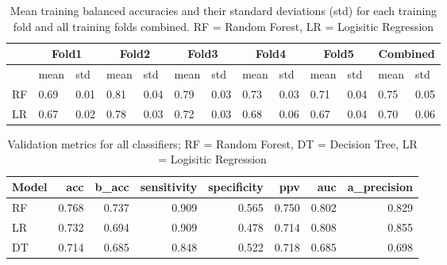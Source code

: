 \begin{table}
\centering
\begin{tabular}{lllllllllllll}
 &
  \multicolumn{2}{c}{Fold1} &
  \multicolumn{2}{c}{Fold2} &
  \multicolumn{2}{c}{Fold3} &
  \multicolumn{2}{c}{Fold4} &
  \multicolumn{2}{c}{Fold5} &
  \multicolumn{2}{c}{Combined} \\ \hline
   & mean & std  & mean & std  & mean & std  & mean & std  & mean & std  & mean 
& std  \\ \hline
RF & 0.69 & 0.01 & 0.81 & 0.04 & 0.79 & 0.03 & 0.73 & 0.03 & 0.71 & 0.04 & 0.75 
& 0.05 \\
LR & 0.67 & 0.02 & 0.78 & 0.03 & 0.72 & 0.03 & 0.68 & 0.06 & 0.67 & 0.04 & 0.70 
& 0.06
\end{tabular}
\caption{Mean training balanced accuracies and their standard deviations (std) 
for each training fold and all training folds combined. RF = Random Forest, 
LR = Logisitic Regression }
\label{tab:training-b_acc}
\end{table}
\begin{table}
\centering
\begin{tabular}{lrrrrrrr}
Model &   acc &  b\_acc &  sensitivity &  specificity &   ppv &   auc &  
a\_precision \\ \hline
   RF & 0.768 &  0.737 &        0.909 &        0.565 & 0.750 & 0.802 &        
0.829 \\
   LR & 0.732 &  0.694 &        0.909 &        0.478 & 0.714 & 0.808 &        
0.855 \\
   DT & 0.714 &  0.685 &        0.848 &        0.522 & 0.718 & 0.685 &        
0.698 \\
\end{tabular}
\caption{Validation metrics for all classifiers; RF = Random Forest, DT = 
Decision Tree, LR = Logisitic Regression}
\label{tab:validation-metrics}
\end{table}







